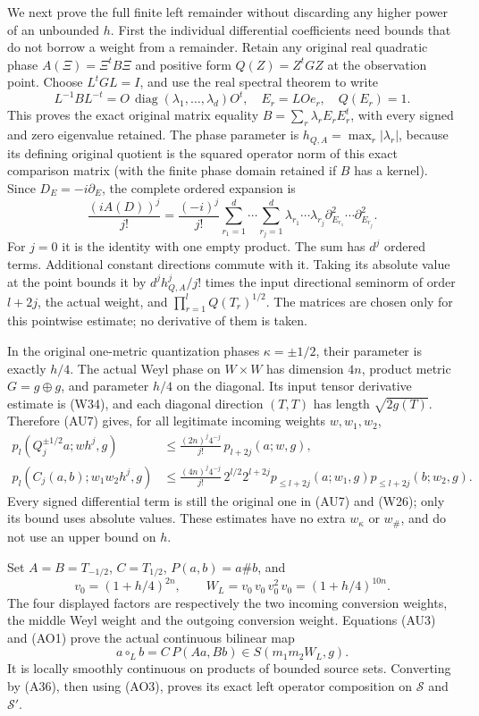 \documentclass[
  11pt,
]{article}
\begin{document}
We next prove the full finite left remainder without discarding any
higher power of an unbounded \(h\). First the individual differential
coefficients need bounds that do not borrow a weight from a remainder.
Retain any original real quadratic phase \(A(\Xi)=\Xi^tB\Xi\) and
positive form \(Q(Z)=Z^tGZ\) at the observation point. Choose
\(L^tGL=I\), and use the real spectral theorem to write \[
L^{-1}BL^{-t}=O\,\operatorname{diag}(\lambda_1,\ldots,\lambda_d)O^t,
\quad E_r=LOe_r,\quad Q(E_r)=1.
\tag{AU6}
\] This proves the exact original matrix equality
\(B=\sum_r\lambda_rE_rE_r^t\), with every signed and zero eigenvalue
retained. The phase parameter is \(h_{Q,A}=\max_r|\lambda_r|\), because
its defining original quotient is the squared operator norm of this
exact comparison matrix (with the finite phase domain retained if \(B\)
has a kernel). Since \(D_E=-i\partial_E\), the complete ordered
expansion is \[
\frac{(iA(D))^j}{j!}
=\frac{(-i)^j}{j!}
 \sum_{r_1=1}^d\cdots\sum_{r_j=1}^d
 \lambda_{r_1}\cdots\lambda_{r_j}
 \partial_{E_{r_1}}^2\cdots\partial_{E_{r_j}}^2.
\tag{AU7}
\] For \(j=0\) it is the identity with one empty product. The sum has
\(d^j\) ordered terms. Additional constant directions commute with it.
Taking its absolute value at the point bounds it by \(d^jh_{Q,A}^j/j!\)
times the input directional seminorm of order \(l+2j\), the actual
weight, and \(\prod_{r=1}^lQ(T_r)^{1/2}\). The matrices are chosen only
for this pointwise estimate; no derivative of them is taken.

In the original one-metric quantization phases \(\kappa=\pm1/2\), their
parameter is exactly \(h/4\). The actual Weyl phase on \(W\times W\) has
dimension \(4n\), product metric \(G=g\oplus g\), and parameter \(h/4\)
on the diagonal. Its input tensor derivative estimate is (W34), and each
diagonal direction \((T,T)\) has length \(\sqrt{2g(T)}\). Therefore
(AU7) gives, for all legitimate incoming weights \(w,w_1,w_2\), \[
\begin{aligned}
p_l(Q_j^{\pm1/2}a;wh^j,g)
 &\le \frac{(2n)^j4^{-j}}{j!}\,p_{l+2j}(a;w,g),\\
p_l(C_j(a,b);w_1w_2h^j,g)
 &\le \frac{(4n)^j4^{-j}}{j!}\,2^{l/2}2^{l+2j}
 p_{\le l+2j}(a;w_1,g)p_{\le l+2j}(b;w_2,g).
\end{aligned}
\tag{AU8}
\] Every signed differential term is still the original one in (AU7) and
(W26); only its bound uses absolute values. These estimates have no
extra \(w_\kappa\) or \(w_\#\), and do not use an upper bound on \(h\).

Set \(A=B=T_{-1/2}\), \(C=T_{1/2}\), \(P(a,b)=a\#b\), and \[
v_0=(1+h/4)^{2n},\qquad
W_L=v_0\,v_0\,v_0^2\,v_0=(1+h/4)^{10n}.
\tag{AU9}
\] The four displayed factors are respectively the two incoming
conversion weights, the middle Weyl weight and the outgoing conversion
weight. Equations (AU3) and (AO1) prove the actual continuous bilinear
map \[
a\circ_L b=C\,P(Aa,Bb)\in S(m_1m_2W_L,g).
\tag{AU10}
\] It is locally smoothly continuous on products of bounded source sets.
Converting by (A36), then using (AO3), proves its exact left operator
composition on \(\mathcal S\) and \(\mathcal S'\).
\end{document}
